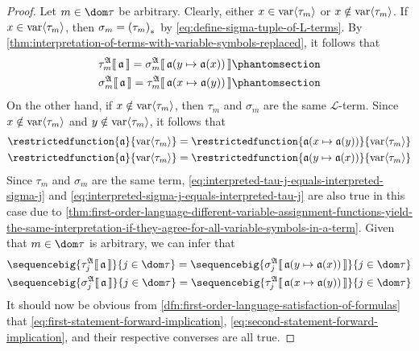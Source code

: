 \begin{proof}
    \vspace{0.3cm}
    \noindent
    Let \( m \in \dom \tau \) be arbitrary. Clearly, either \( x \in \operatorname{var} \langle\tau_{m}\rangle \) or \( x \notin \operatorname{var} \langle\tau_{m}\rangle \).
    If \( x \in \operatorname{var} \langle\tau_{m}\rangle \), then \( \sigma_{m} = \mleft( \tau_{m} \mright)_{\ast} \) by \eqref{eq:define-sigma-tuple-of-L-terms}.
    By \cref{thm:interpretation-of-terms-with-variable-symbols-replaced}, it follows that
    \begin{gather}
        \folterminterpretation{\tau_{m}}{\mathfrak{A}}{\mathfrak{a}} =
        \folterminterpretation{\sigma_{m}}{\mathfrak{A}}{ \folmodifiedvariableassignmentfunction{\mathfrak{a}}{y}{\mathfrak{a}(x)} }
        \phantomsection \label{eq:interpreted-tau-j-equals-interpreted-sigma-j} \\
        \folterminterpretation{\sigma_{m}}{\mathfrak{A}}{\mathfrak{a}} =
        \folterminterpretation{\tau_{m}}{\mathfrak{A}}{ \folmodifiedvariableassignmentfunction{\mathfrak{a}}{x}{\mathfrak{a}(y)} }
        \phantomsection \label{eq:interpreted-sigma-j-equals-interpreted-tau-j}
    \end{gather}
    On the other hand, if \( x \notin \operatorname{var} \langle\tau_{m}\rangle \), then \( \tau_{m} \) and \( \sigma_{m} \) are the same \( \mathcal{L} \)-term.
    Since \( x \notin \operatorname{var} \langle\tau_{m}\rangle \) and \( y \notin \operatorname{var} \langle\tau_{m}\rangle \), it follows that
    \begin{gather*}
        \restrictedfunction{\mathfrak{a}}{\folvars{\tau_{m}}} = 
        \restrictedfunction{ \folmodifiedvariableassignmentfunction{\mathfrak{a}}{x}{\mathfrak{a}(y)} }{\folvars{\tau_{m}}}\\
        \restrictedfunction{\mathfrak{a}}{ \folvars{\tau_{m}} } =
        \restrictedfunction{ \folmodifiedvariableassignmentfunction{\mathfrak{a}}{y}{\mathfrak{a}(x)} }{\folvars{\tau_{m}}}
    \end{gather*}
    Since \( \tau_{m} \) and \( \sigma_{m} \) are the same term,
    \eqref{eq:interpreted-tau-j-equals-interpreted-sigma-j}
    and \eqref{eq:interpreted-sigma-j-equals-interpreted-tau-j} are also true in this case due to
    \cref{thm:first-order-language-different-variable-assignment-functions-yield-the-same-interpretation-if-they-agree-for-all-variable-symbols-in-a-term}.
    Given that \( m \in \dom \tau \) is arbitrary, we can infer that
    \begin{gather*}
        \sequencebig{ \folterminterpretation{\tau_{j}}{\mathfrak{A}}{\mathfrak{a}} }{j \in \dom \tau} =
        \sequencebig{ \folterminterpretation{\sigma_{j}}{\mathfrak{A}}{ \folmodifiedvariableassignmentfunction{\mathfrak{a}}{y}{ \mathfrak{a}(x) } }}{j \in \dom \tau}\\
        \sequencebig{ \folterminterpretation{\sigma_{j}}{\mathfrak{A}}{\mathfrak{a}} }{ j \in \dom \tau } =
        \sequencebig{ \folterminterpretation{\tau_{j}}{\mathfrak{A}}{ \folmodifiedvariableassignmentfunction{\mathfrak{a}}{x}{ \mathfrak{a}(y) } } }{j \in \dom \tau}
    \end{gather*}
    It should now be obvious from \cref{dfn:first-order-language-satisfaction-of-formulas} that \eqref{eq:first-statement-forward-implication},
    \eqref{eq:second-statement-forward-implication}, and their respective converses are all true.


\end{proof}
